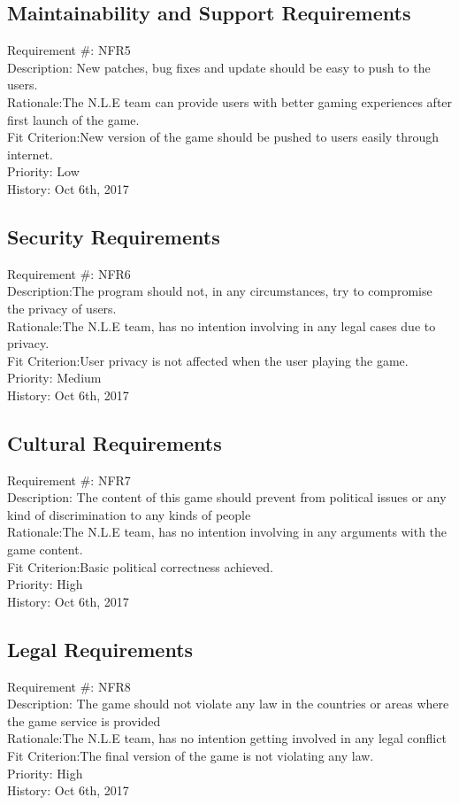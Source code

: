 \documentclass[12pt, titlepage]{article}
\begin{document}
\subsection{Maintainability and Support Requirements}
Requirement \#: NFR5\\
Description: New patches, bug fixes and update should be easy to push to the users.\\
Rationale:The N.L.E team can provide users with better gaming experiences after first launch of the game.\\
Fit Criterion:New version of the game should be pushed to users easily through internet.\\
Priority: Low\\
History: Oct 6th, 2017\\

\subsection{Security Requirements}
Requirement \#: NFR6\\
Description:The program should not, in any circumstances, try to compromise the privacy of users.\\
Rationale:The N.L.E team, has no intention involving in any legal cases due to privacy.\\
Fit Criterion:User privacy is not affected when the user playing the game.\\
Priority: Medium\\
History: Oct 6th, 2017\\
\subsection{Cultural Requirements}
Requirement \#: NFR7\\
Description: The content of this game should prevent from political issues or any kind of discrimination to any kinds of people\\
Rationale:The N.L.E team, has no intention involving in any arguments with the game content.\\
Fit Criterion:Basic political correctness achieved.\\
Priority: High\\
History: Oct 6th, 2017\\
\subsection{Legal Requirements}
Requirement \#: NFR8\\
Description: The game should not violate any law in the countries or areas where the game service is provided\\
Rationale:The N.L.E team, has no intention getting involved in any legal conflict\\
Fit Criterion:The final version of the game is not violating any law.\\
Priority: High\\
History: Oct 6th, 2017\\
\end{document}
